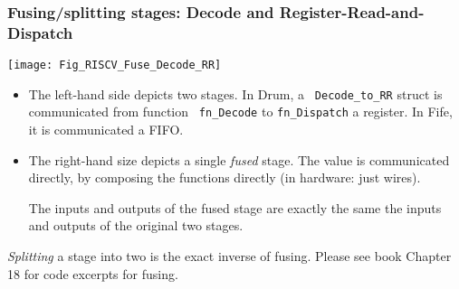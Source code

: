 \begin{frame}[fragile]
\frametitle{Fusing/splitting stages: Decode and Register-Read-and-Dispatch}

\footnotesize

\begin{center}
\texttt{[image: Fig\_RISCV\_Fuse\_Decode\_RR]}
\end{center}

\begin{itemize}\scriptsize

  \item The left-hand side depicts two stages. In Drum, a {\tt
      Decode\_to\_RR} struct is communicated from function {\tt
      fn\_Decode} to {\tt fn\_Dispatch} {\via} a register.  In Fife,
      it is communicated {\via} a FIFO.

  \item The right-hand size depicts a single \emph{fused} stage.  The
      value is communicated directly, by composing the functions
      directly (in hardware: just wires).

      \vx

      The inputs and outputs of the fused stage are exactly the same
      the inputs and outputs of the original two stages.

\end{itemize}

{\scriptsize \emph{Splitting} a stage into two is the exact inverse of fusing.}
\hfill
{\scriptsize Please see book Chapter 18 for {\BSV} code excerpts for fusing.}

\end{frame}



